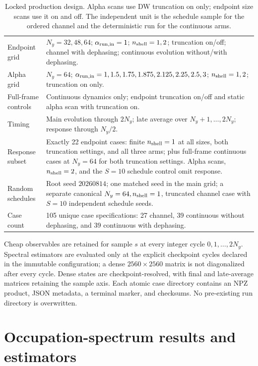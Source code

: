 \documentclass[aps,prb,twocolumn,nofootinbib,superscriptaddress,floatfix]{revtex4-2}
\begin{document}
\begin{table}[t]
\caption{Locked production design.  Alpha scans use DW truncation on only; endpoint
size scans use it on and off.  The independent unit is the schedule sample for the
ordered channel and the deterministic run for the continuous arms.}
\begin{tabularx}{\textwidth}{@{}p{}X@{}}
\toprule
Endpoint grid & $N_y=32,48,64$; $\alpha_{\rm run,in}=1$;
$n_{\rm shell}=1,2$; truncation on/off; channel with dephasing; continuous evolution
without/with dephasing.\\
Alpha grid & $N_y=64$; $\alpha_{\rm run,in}=1,1.5,1.75,1.875,2.125,2.25,2.5,3$;
$n_{\rm shell}=1,2$; truncation on only.\\
Full-frame controls & Continuous dynamics only; endpoint truncation on/off and static
alpha scan with truncation on.\\
Timing & Main evolution through $2N_y$; late average over $N_y+1,\ldots,2N_y$;
response through $N_y/2$.\\
Response subset & Exactly 22 endpoint cases: finite $n_{\rm shell}=1$ at all sizes,
both truncation settings, and all three arms; plus full-frame continuous cases at
$N_y=64$ for both truncation settings.  Alpha scans, $n_{\rm shell}=2$, and the
$S=10$ schedule control omit response.\\
Random schedules & Root seed $20260814$; one matched seed in the main grid; a separate
canonical $N_y=64,n_{\rm shell}=1$, truncated channel case with $S=10$ independent
schedule seeds.\\
Case count & 105 unique case specifications: 27 channel, 39 continuous without
dephasing, and 39 continuous with dephasing.\\
\bottomrule
\end{tabularx}
\end{table}

Cheap observables are retained for sample $s$ at every integer cycle
$0,1,\ldots,2N_y$.  Spectral estimators are evaluated only at the explicit checkpoint
cycles declared in the immutable configuration; a dense $2560\times2560$ matrix is not
diagonalized after every cycle.  Dense states are checkpoint-resolved, with final and
late-average matrices retaining the sample axis.  Each atomic case directory contains
an NPZ product, JSON metadata, a terminal marker, and checksums.  No pre-existing run
directory is overwritten.

\section{Occupation-spectrum results and estimators}
\end{document}
